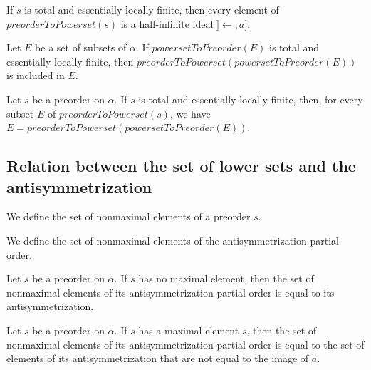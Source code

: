 \begin{sublemma}
If $s$ is total and essentially locally finite, then every element of $preorderToPowerset(s)$ is a half-infinite ideal
$]\leftarrow,a]$.

\end{sublemma}

\begin{sublemma}
Let $E$ be a set of subsets of $\alpha$. If $powersetToPreorder(E)$ is total and essentially locally finite, then
$preorderToPowerset(powersetToPreorder(E))$ is included in $E$.

\end{sublemma}

\begin{sublemma}
Let $s$ be a preorder on $\alpha$. If $s$ is total and essentially locally finite, then, for every subset $E$ of $preorderToPowerset(s)$,
we have $E=preorderToPowerset(powersetToPreorder(E))$.

\end{sublemma}


\subsection{Relation between the set of lower sets and the antisymmetrization}

\begin{subdefi}
We define the set of nonmaximal elements of a preorder $s$.

\end{subdefi}

\begin{subdefi}
We define the set of nonmaximal elements of the antisymmetrization partial order.

\end{subdefi}

\begin{sublemma}
Let $s$ be a preorder on $\alpha$. If $s$ has no maximal element, then the set of nonmaximal elements of its antisymmetrization
partial order is equal to its antisymmetrization.

\end{sublemma}

\begin{sublemma}
Let $s$ be a preorder on $\alpha$. If $s$ has a maximal element $s$, then the set of nonmaximal elements of its antisymmetrization
partial order is equal to the set of elements of its antisymmetrization that are not equal to the image of $a$.

\end{sublemma}

